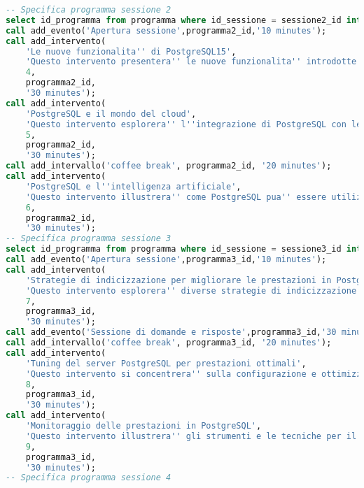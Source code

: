 \begin{lstlisting}[language=SQL, style=mystyle,caption={Conferenza PGConf NPL}]
-- Specifica programma sessione 2
select id_programma from programma where id_sessione = sessione2_id into programma2_id;
call add_evento('Apertura sessione',programma2_id,'10 minutes');
call add_intervento(
    'Le nuove funzionalita'' di PostgreSQL15',
    'Questo intervento presentera'' le nuove funzionalita'' introdotte nella versione 14 di PostgreSQL e come queste possono influenzare il futuro dello sviluppo e dell''utilizzo del database.',
    4,
    programma2_id,
    '30 minutes');
call add_intervento(
    'PostgreSQL e il mondo del cloud',
    'Questo intervento esplorera'' l''integrazione di PostgreSQL con le piattaforme di cloud computing e le implicazioni di questa evoluzione per le applicazioni e l''adozione del database nel futuro.',
    5,
    programma2_id,
    '30 minutes');
call add_intervallo('coffee break', programma2_id, '20 minutes');
call add_intervento(
    'PostgreSQL e l''intelligenza artificiale',
    'Questo intervento illustrera'' come PostgreSQL pua'' essere utilizzato nell''ambito dell''intelligenza artificiale, compresi casi d''uso, funzionalita'' e best practice per l''integrazione di PostgreSQL con strumenti e librerie di AI.',
    6,
    programma2_id,
    '30 minutes');
-- Specifica programma sessione 3
select id_programma from programma where id_sessione = sessione3_id into programma3_id;
call add_evento('Apertura sessione',programma3_id,'10 minutes');
call add_intervento(
    'Strategie di indicizzazione per migliorare le prestazioni in PostgreSQL',
    'Questo intervento esplorera'' diverse strategie di indicizzazione per ottimizzare le prestazioni delle query in PostgreSQL, compreso l''utilizzo di indici multi-colonna, indici parziali e indici funzionali',
    7,
    programma3_id,
    '30 minutes');
call add_evento('Sessione di domande e risposte',programma3_id,'30 minutes');
call add_intervallo('coffee break', programma3_id, '20 minutes');
call add_intervento(
    'Tuning del server PostgreSQL per prestazioni ottimali',
    'Questo intervento si concentrera'' sulla configurazione e ottimizzazione del server PostgreSQL per garantire prestazioni ottimali, compreso il tuning dei parametri di configurazione e la gestione della memoria.',
    8,
    programma3_id,
    '30 minutes');
call add_intervento(
    'Monitoraggio delle prestazioni in PostgreSQL',
    'Questo intervento illustrera'' gli strumenti e le tecniche per il monitoraggio delle prestazioni in PostgreSQL, compresi i metodi per identificare e risolvere i colli di bottiglia e i problemi di prestazioni.',
    9,
    programma3_id,
    '30 minutes');
-- Specifica programma sessione 4

\end{lstlisting}
